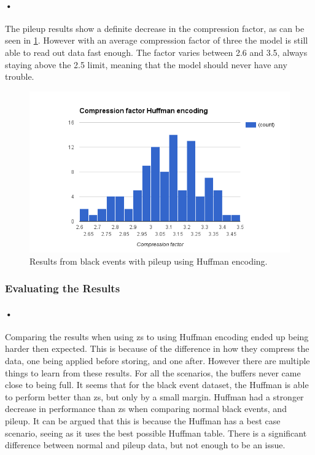 \documentclass[a4paper, 12pt]{report}
\begin{document}
\paragraph{•}
The pileup results show a definite decrease in the compression factor, as can be seen in \ref{fig:comp-huffman-pileup}.
However with an average compression factor of three the model is still able to read out data fast enough.
The factor varies between 2.6 and 3.5, always staying above the 2.5 limit, meaning that the model should never have any trouble.

\begin{figure}[h!]
	\centering
		\includegraphics[width=1.0\textwidth]{images/compression-factor-pileup-huffman.png}
		\caption{Results from black events with pileup using Huffman encoding.}
		\label{fig:comp-huffman-pileup}
\end{figure}

\subsubsection{Evaluating the Results}

\paragraph{•}
Comparing the results when using \gls{zs} to using Huffman encoding ended up being harder then expected.
This is because of the difference in how they compress the data, one being applied before storing, and one after.
However there are multiple things to learn from these results.
For all the scenarios, the buffers never came close to being full.
It seems that for the black event dataset, the Huffman is able to perform better than \gls{zs}, but only by a small margin.
Huffman had a stronger decrease in performance than \gls{zs} when comparing normal black events, and pileup.
It can be argued that this is because the Huffman has a best case scenario, seeing as it uses the best possible Huffman table.
There is a significant difference between normal and pileup data, but not enough to be an issue.
\end{document}
